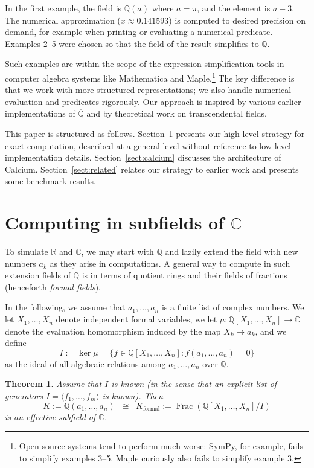 \documentclass[sigconf,screen,urlbreakonhyphens]{acmart}
\newtheorem{theorem}{Theorem}
\begin{document}
In the first example, the field is $\mathbb{Q}(a)$ where $a = \pi$,
and the element is $a-3$.
The numerical approximation ($x \approx 0.141593$) is computed to
desired precision on demand, for example when printing
or evaluating a numerical predicate.
Examples 2--5 were chosen so that the field
of the result simplifies to $\mathbb{Q}$.

Such examples are within the scope of the
expression simplification tools in computer algebra systems like
Mathematica and Maple.\footnote{Open source systems
tend to perform much worse: SymPy, for example,
fails to simplify examples 3--5. Maple curiously also fails to simplify example 3.}
The key difference is that we
work with more structured representations;
we also handle numerical evaluation and predicates rigorously.
Our approach is inspired by
various earlier implementations of $\overline{\mathbb{Q}}$
and by theoretical work on transcendental fields.

This paper is structured as follows. Section~\ref{sect:algebraic}
presents our high-level strategy for exact computation, described at a general level
without reference to low-level implementation details.
Section~\ref{sect:calcium} discusses the architecture of Calcium.
Section~\ref{sect:related} relates our strategy
to earlier work and presents some benchmark results.

\section{Computing in subfields of $\mathbb{C}$}

\label{sect:algebraic}

To simulate $\mathbb{R}$ and $\mathbb{C}$,
we may start with $\mathbb{Q}$ and
lazily extend the field with new numbers $a_k$ as they arise
in computations.
A general way to compute in such extension fields of $\mathbb{Q}$
is in terms of quotient rings
and their fields of fractions (henceforth \emph{formal fields}).

In the following, we assume that $a_1,\ldots,a_n$ is a finite list of complex numbers.
We let $X_1,\ldots,X_n$ denote independent formal variables,
we let $\mu : \mathbb{Q}[X_1,\ldots,X_n] \to \mathbb{C}$ denote
the evaluation homomorphism
induced by the map $X_k \mapsto a_k$,
and we define $$I := \ker \mu = \{ f \in \mathbb{Q}[X_1,\ldots,X_n]: f(a_1,\ldots,a_n) = 0\}$$
as the ideal of all algebraic relations among $a_1,\ldots,a_n$ over $\mathbb{Q}$.

\begin{theorem}
Assume that $I$ is known (in the sense
that an explicit list of generators $I = \langle f_1, \ldots, f_m \rangle$ is known). Then
$$K := \mathbb{Q}(a_1,\ldots,a_n) \;\; \cong \;\; K_{\text{formal}} := \operatorname{Frac}(\mathbb{Q}[X_1,\ldots,X_n] / I)$$
is an effective subfield of $\mathbb{C}$.
\label{thm:effective}
\end{theorem}
\end{document}
